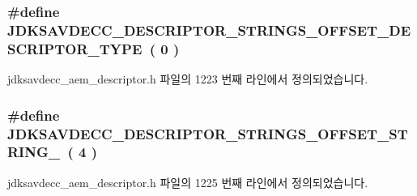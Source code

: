 \subsubsection[{\texorpdfstring{J\+D\+K\+S\+A\+V\+D\+E\+C\+C\+\_\+\+D\+E\+S\+C\+R\+I\+P\+T\+O\+R\+\_\+\+S\+T\+R\+I\+N\+G\+S\+\_\+\+O\+F\+F\+S\+E\+T\+\_\+\+D\+E\+S\+C\+R\+I\+P\+T\+O\+R\+\_\+\+T\+Y\+PE}{JDKSAVDECC_DESCRIPTOR_STRINGS_OFFSET_DESCRIPTOR_TYPE}}]{\setlength{\rightskip}{0pt plus 5cm}\#define J\+D\+K\+S\+A\+V\+D\+E\+C\+C\+\_\+\+D\+E\+S\+C\+R\+I\+P\+T\+O\+R\+\_\+\+S\+T\+R\+I\+N\+G\+S\+\_\+\+O\+F\+F\+S\+E\+T\+\_\+\+D\+E\+S\+C\+R\+I\+P\+T\+O\+R\+\_\+\+T\+Y\+PE~( 0 )}\hypertarget{group__descriptor__strings_gab1dc6ebdf66d887e60fa02f919e13546}{}\label{group__descriptor__strings_gab1dc6ebdf66d887e60fa02f919e13546}


jdksavdecc\+\_\+aem\+\_\+descriptor.\+h 파일의 1223 번째 라인에서 정의되었습니다.

\subsubsection[{\texorpdfstring{J\+D\+K\+S\+A\+V\+D\+E\+C\+C\+\_\+\+D\+E\+S\+C\+R\+I\+P\+T\+O\+R\+\_\+\+S\+T\+R\+I\+N\+G\+S\+\_\+\+O\+F\+F\+S\+E\+T\+\_\+\+S\+T\+R\+I\+N\+G\+\_\+0}{JDKSAVDECC_DESCRIPTOR_STRINGS_OFFSET_STRING_0}}]{\setlength{\rightskip}{0pt plus 5cm}\#define J\+D\+K\+S\+A\+V\+D\+E\+C\+C\+\_\+\+D\+E\+S\+C\+R\+I\+P\+T\+O\+R\+\_\+\+S\+T\+R\+I\+N\+G\+S\+\_\+\+O\+F\+F\+S\+E\+T\+\_\+\+S\+T\+R\+I\+N\+G\+\_~( 4 )}\hypertarget{group__descriptor__strings_gab9913a38c283200ad176d5101dfa248f}{}\label{group__descriptor__strings_gab9913a38c283200ad176d5101dfa248f}


jdksavdecc\+\_\+aem\+\_\+descriptor.\+h 파일의 1225 번째 라인에서 정의되었습니다.

